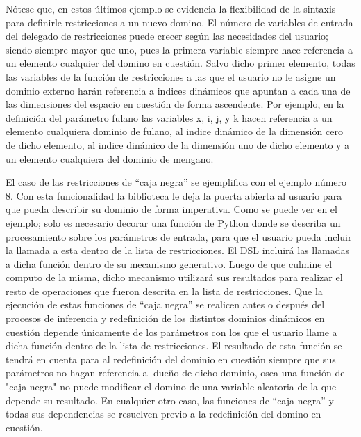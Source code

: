 Nótese que, en estos últimos ejemplo se evidencia la flexibilidad de la sintaxis para definirle restricciones a un
nuevo domino. El número de variables de entrada del delegado de restricciones puede crecer según las necesidades
del usuario; siendo siempre mayor que uno, pues la primera variable siempre hace referencia a un elemento cualquier
del domino en cuestión. Salvo dicho primer elemento, todas las variables de la función de restricciones a las que
el usuario no le asigne un dominio externo harán referencia a indices dinámicos que apuntan a cada una de las
dimensiones del espacio en cuestión de forma ascendente. Por ejemplo, en la definición del parámetro fulano las
variables x, i, j, y k hacen referencia a un elemento cualquiera dominio de fulano, al indice dinámico de la
dimensión cero de dicho elemento, al indice dinámico de la dimensión uno de dicho elemento y a un elemento
cualquiera del dominio de mengano.

El caso de las restricciones de “caja negra” se ejemplifica con el ejemplo número 8. Con esta funcionalidad
la biblioteca le deja la puerta abierta al usuario para que pueda describir su dominio de forma imperativa.
Como se puede ver en el ejemplo; solo es necesario decorar una función de Python donde se describa un
procesamiento sobre los parámetros de entrada, para que el usuario pueda incluir la llamada a esta dentro de
la lista de restricciones. El DSL incluirá las llamadas a dicha función dentro de su mecanismo generativo.
Luego de que culmine el computo de la misma, dicho mecanismo utilizará sus resultados para realizar el resto
de operaciones que fueron descrita en la lista de restricciones. Que la ejecución de estas funciones de
“caja negra” se realicen antes o después del procesos de inferencia y redefinición de los distintos dominios
dinámicos en cuestión depende únicamente de los parámetros con los que el usuario llame a dicha función dentro
de la lista de restricciones. El resultado de esta función se tendrá en cuenta para al redefinición del dominio
en cuestión siempre que sus parámetros no hagan referencia al dueño de dicho dominio, osea una función de
"caja negra" no puede modificar el domino de una variable aleatoria de la que depende su resultado. En
cualquier otro caso, las funciones de “caja negra” y todas sus dependencias se resuelven previo a la
redefinición del domino en cuestión.

